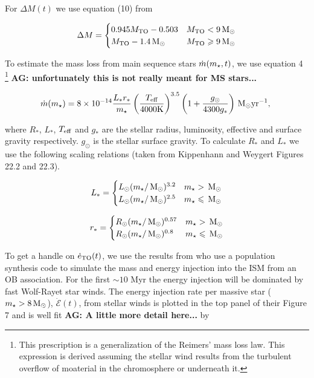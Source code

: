 For $\Delta M(t)$ we use equation (10) from \citet{CiottiOstriker:2007a}

\begin{align}
\Delta M=
\begin{cases}
0.945 M_{\rm TO}-0.503 & M_{\rm TO} < 9 \,{\rm M_\odot}\\
 M_{\rm TO}-1.4 \,{\rm M_\odot} &  M_{\rm TO} \geqslant 9 \,{\rm M_\odot}
\end{cases}
\end{align}

To estimate the mass loss from main sequence stars
$\dot{m}(m_{\star}, t)$,
we use equation 4 \citet{SchroderCuntz:2005a}\footnote{This
  prescription is a generalization of the Reimers' mass loss law. This
expression is derived assuming the stellar wind results from the
turbulent overflow of moaterial in the chromosphere or underneath it.} {\bf AG:
  unfortunately this is not really meant for MS stars...}

\begin{align}
  \dot{m}(m_{\star})=8 \times 10^{-14} \frac{L_* r_*}{m_{\star}}
  \left(\frac{T_{\rm eff}}{\rm 4000 K}\right)^{3.5}
  \left(1+\frac{g_{\odot}}{4300 g_*}\right) \,{\rm M_\odot} {\rm yr}^{-1},\
\end{align}

where  $R_*$, $L_*$, $T_{\rm eff}$ and $g_*$ are the stellar radius,
luminosity, effective and surface gravity respectively. $g_{\odot}$ is
the stellar surface gravity. To calculate $R_*$ and $L_*$ we use the
following scaling relations (taken from Kippenhann and Weygert Figures
22.2 and 22.3).

\begin{align}
L_*=
\begin{cases}
L_{\odot} (m_{\star}/\,{\rm M_\odot})^{3.2} & m_{\star} > \,{\rm M_\odot} \\
L_{\odot} (m_{\star}/\,{\rm M_\odot})^{2.5} & m_{\star} \leqslant \,{\rm M_\odot}
\end{cases}
\end{align}

\begin{align}
r_*=
\begin{cases}
R_{\odot} (m_{\star}/\,{\rm M_\odot})^{0.57} & m_{\star} > \,{\rm M_\odot} \\
R_{\odot} (m_{\star}/\,{\rm M_\odot})^{0.8} & m_{\star} \leqslant \,{\rm M_\odot}
\end{cases}
\end{align}


To get a handle on $\dot{e}_{\rm TO}(t)$, we use the results from
\citet{VossDiehl+:2009a} who use a population synthesis code to
simulate the mass and energy injection into the ISM from an OB
association. For the first $\sim 10$ Myr the energy injection will
be dominated by fast Wolf-Rayet star winds. The energy injection rate
per massive star ($m_{\star}>8 \,{\rm M_\odot}$), $\dot{\mathcal{E}} (t)$, from
stellar winds is plotted in the top panel of their Figure 7 and is
well fit {\bf AG: A little more detail here...} by


